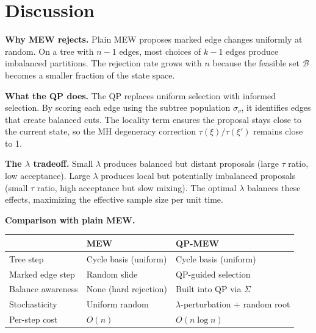 \documentclass[11pt]{article}
\begin{document}
\section{Discussion}\label{sec:discussion}

\noindent\textbf{Why MEW rejects.} Plain MEW proposes marked edge changes uniformly at random. On a tree with $n - 1$ edges, most choices of $k - 1$ edges produce imbalanced partitions. The rejection rate grows with $n$ because the feasible set $\mathcal{B}$ becomes a smaller fraction of the state space.

\medskip
\noindent\textbf{What the QP does.} The QP replaces uniform selection with informed selection. By scoring each edge using the subtree population $\sigma_v$, it identifies edges that create balanced cuts. The locality term ensures the proposal stays close to the current state, so the MH degeneracy correction $\tau(\xi)/\tau(\xi')$ remains close to 1.

\medskip
\noindent\textbf{The $\lambda$ tradeoff.} Small $\lambda$ produces balanced but distant proposals (large $\tau$ ratio, low acceptance). Large $\lambda$ produces local but potentially imbalanced proposals (small $\tau$ ratio, high acceptance but slow mixing). The optimal $\lambda$ balances these effects, maximizing the effective sample size per unit time.

\medskip
\noindent\textbf{Comparison with plain MEW.}
\begin{center}
\renewcommand{\arraystretch}{1.3}
\begin{tabular}{lll}
\toprule
& \textbf{MEW} & \textbf{QP-MEW} \\
\midrule
Tree step & Cycle basis (uniform) & Cycle basis (uniform) \\
Marked edge step & Random slide & QP-guided selection \\
Balance awareness & None (hard rejection) & Built into QP via $\Sigma$ \\
Stochasticity & Uniform random & $\lambda$-perturbation $+$ random root \\
Per-step cost & $O(n)$ & $O(n \log n)$ \\
\bottomrule
\end{tabular}
\end{center}




\end{document}
